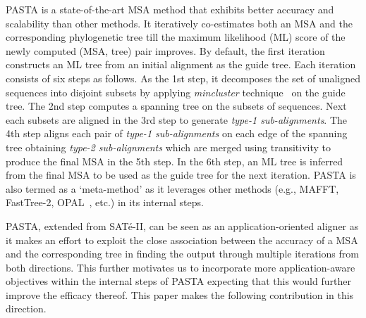 PASTA is a state-of-the-art MSA method that exhibits better accuracy and scalability than other methods. It iteratively co-estimates both an MSA and the corresponding phylogenetic tree till the maximum likelihood (ML) score of the newly computed (MSA, tree) pair improves. By default, the first iteration constructs an ML tree from an initial alignment as the guide tree. Each iteration consists of six steps as follows. As the 1st step, it decomposes the set of unaligned sequences into disjoint subsets by applying \textit{mincluster} technique~\cite{balaban2019treecluster} on the guide tree. The 2nd step computes a spanning tree on the subsets of sequences. Next each subsets are aligned in the 3rd step to generate \textit{type-1 sub-alignments}. The 4th step aligns each pair of \textit{type-1 sub-alignments} on each edge of the spanning tree obtaining \textit{type-2 sub-alignments} which are merged using transitivity to produce the final MSA in the 5th step. In the 6th step, an ML tree is inferred from the final MSA to be used as the guide tree for the next iteration. PASTA is also termed as a `meta-method' as it leverages other methods (e.g., MAFFT, FastTree-2, OPAL~\cite{wheeler2007multiple}, etc.) in its internal steps. 

PASTA, extended from SAT\'e-II, can be seen as an application-oriented aligner 
as it makes an effort to exploit the close association between the
accuracy of a MSA and the corresponding tree in finding the output through multiple iterations from both directions. 
This further motivates us to incorporate more application-aware objectives within the internal steps of PASTA expecting that this would further improve the efficacy thereof. This paper makes the following contribution in this direction. 

